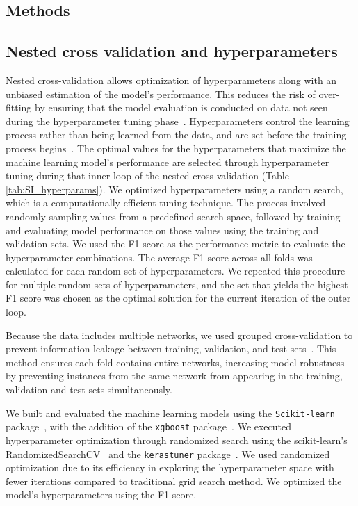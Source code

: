 \documentclass[oneside, a4paper, onecolumn, 11pt]{article}
\begin{document}
\begin{refsection}
\section*{Methods}

\subsection*{Nested cross validation and hyperparameters} \label{sec:cv}
Nested cross-validation allows optimization of hyperparameters along with an unbiased estimation of the model's performance. This reduces the risk of over-fitting by ensuring that the model evaluation is conducted on data not seen during the hyperparameter tuning phase~\autocite{Yates2023-xv}. Hyperparameters control the learning process rather than being learned from the data, and are set before the training process begins~\autocite{Bergstra2012-nt}. The optimal values for the hyperparameters that maximize the machine learning model's performance are selected through hyperparameter tuning during that inner loop of the nested cross-validation (Table \ref{tab:SI_hyperparams}). We optimized hyperparameters using a random search, which is a computationally efficient tuning technique. The process involved randomly sampling values from a predefined search space, followed by training and evaluating model performance on those values using the training and validation sets. We used the F1-score as the performance metric to evaluate the hyperparameter combinations. The average F1-score across all folds was calculated for each random set of hyperparameters. We repeated this procedure for multiple random sets of hyperparameters, and the set that yields the highest F1 score was chosen as the optimal solution for the current iteration of the outer loop. 

Because the data includes multiple networks, we used grouped cross-validation to prevent information leakage between training, validation, and test sets~\autocite{Roberts2017-br}. This method ensures each fold contains entire networks, increasing model robustness by preventing instances from the same network from appearing in the training, validation and test sets simultaneously.

We built and evaluated the machine learning models using the \verb|Scikit-learn| package~\autocite{Pedregosa2011-bw}, with the addition of the \verb|xgboost| package~\autocite{Chen2016-oy}. We executed hyperparameter optimization through randomized search using the scikit-learn's RandomizedSearchCV~\autocite{Pedregosa2011-bw} and the \verb|kerastuner| package~\autocite{OMalley2019-mc}. We used randomized optimization due to its efficiency in exploring the hyperparameter space with fewer iterations compared to traditional grid search method. We optimized the model's hyperparameters using the F1-score. 


\end{refsection}
\end{document}
